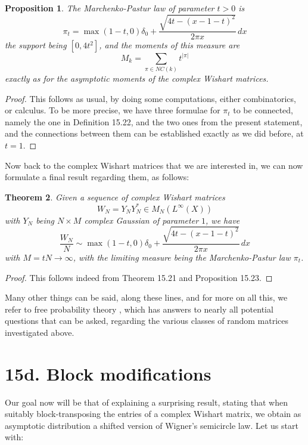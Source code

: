 \documentclass[12pt]{amsbook}
\newtheorem{theorem}{Theorem}[chapter]
\newtheorem{proposition}[theorem]{Proposition}
\begin{document}
\begin{proposition}
The Marchenko-Pastur law of parameter $t>0$ is
$$\pi_t=\max(1-t,0)\delta_0+\frac{\sqrt{4t-(x-1-t)^2}}{2\pi x}\,dx$$
the support being $[0,4t^2]$, and the moments of this measure are
$$M_k=\sum_{\pi\in NC(k)}t^{|\pi|}$$
exactly as for the asymptotic moments of the complex Wishart matrices.
\end{proposition}

\begin{proof}
This follows as usual, by doing some computations, either combinatorics, or calculus. To be more precise, we have three formulae for $\pi_t$ to be connected, namely the one in Definition 15.22, and the two ones from the present statement, and the connections between them can be established exactly as we did before, at $t=1$. 
\end{proof}

Now back to the complex Wishart matrices that we are interested in, we can now formulate a final result regarding them, as follows:


\begin{theorem}
Given a sequence of complex Wishart matrices
$$W_N=Y_NY_N^*\in M_N(L^\infty(X))$$
with $Y_N$ being $N\times M$ complex Gaussian of parameter $1$, we have
$$\frac{W_N}{N}\sim\max(1-t,0)\delta_0+\frac{\sqrt{4t-(x-1-t)^2}}{2\pi x}\,dx$$
with $M=tN\to\infty$, with the limiting measure being the Marchenko-Pastur law $\pi_t$.
\end{theorem}

\begin{proof}
This follows indeed from Theorem 15.21 and Proposition 15.23.
\end{proof}

Many other things can be said, along these lines, and for more on all this, we refer to free probability theory \cite{vdn}, which has answers to nearly all potential questions that can be asked, regarding the various classes of random matrices investigated above.

\section*{15d. Block modifications}

Our goal now will be that of explaining a surprising result, stating that when suitably block-transposing the entries of a complex Wishart matrix, we obtain as asymptotic distribution a shifted version of Wigner's semicircle law. Let us start with:
\end{document}
